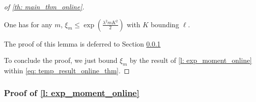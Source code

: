 \begin{proof}[of \cref{th: main_thm_online}]
\begin{lemma}
\label{l: exp_moment_online}
One has for any $m$, $\xi_m \leq \exp\left(\frac{\lambda^2m K^2}{2}\right)$ with $K$ bounding $\ell$.
\end{lemma}

The proof of this lemma is deferred to Section \ref{sec: proof_exp_moment_online}


To conclude the proof, we just bound $\xi_m$ by the result of \cref{l: exp_moment_online} within \cref{eq: temp_result_online_thm}.
\end{proof}

\subsubsection{Proof of \cref{l: exp_moment_online}}
\label{sec: proof_exp_moment_online}


